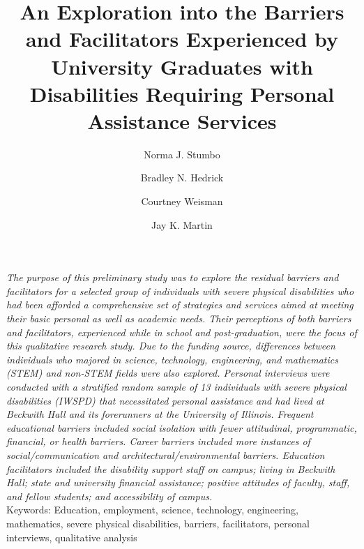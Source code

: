 \documentclass[11.5pt]{sig-alternate} %
\makeatletter
\let\oldabstract\abstract
\let\oldendabstract\endabstract
\renewenvironment{abstract} %
{\renewenvironment{quotation}%
               {\list{}{\addtolength{\leftmargin}{1em} %
                        \listparindent 1.5em%
                        \itemindent    \listparindent%
                        \rightmargin   \leftmargin%
                        \parsep        \z@ \@plus\p@}%
                \item\relax}%
               {\endlist}%
\oldabstract}
{\oldendabstract}
\makeatother
\begin{document}
\title{An Exploration into the Barriers and Facilitators Experienced by University Graduates with Disabilities Requiring Personal Assistance Services}

\author[1]{\large \color{blue} Norma J. Stumbo}
\author[1]{\large \color{blue} Bradley N. Hedrick}
\author[ ]{\large \color{blue} Courtney Weisman}
\author[2]{\large \color{blue} Jay K. Martin}


\toappear{}

\maketitle
\begin{@twocolumnfalse} 
\begin{abstract}
\begin{large}
\item 
\textit{The purpose of this preliminary study was to explore the residual barriers and facilitators for a selected group of individuals with severe physical disabilities who had been afforded a comprehensive set of strategies and services aimed at meeting their basic personal as well as academic needs. Their perceptions of both barriers and facilitators, experienced while in school and post-graduation, were the focus of this qualitative research study. Due to the funding source, differences between individuals who majored in science, technology, engineering, and mathematics (STEM) and non-STEM fields were also explored. Personal interviews were conducted with a stratified random sample of 13 individuals with severe physical disabilities (IWSPD) that necessitated personal assistance and had lived at Beckwith Hall and its forerunners at the University of Illinois. Frequent educational barriers included social isolation with fewer attitudinal, programmatic, financial, or health barriers. Career barriers included more instances of social/communication and architectural/environmental barriers. Education facilitators included the disability support staff on campus; living in Beckwith Hall; state and university financial assistance; positive attitudes of faculty, staff, and fellow students; and accessibility of campus.}\\
 
Keywords: Education, employment, science, technology, engineering, mathematics, severe physical disabilities, barriers, facilitators, personal interviews, qualitative analysis

\end{large}     
\end{abstract}
\end{@twocolumnfalse}
\end{document}
